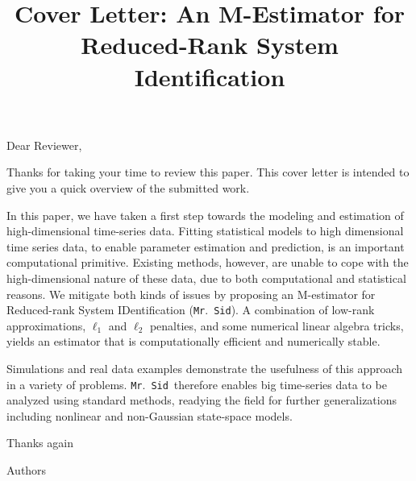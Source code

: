 \documentclass[fleqn,12pt]{article}
\newcommand{\mrsid}{{\sc \texttt{Mr}.~\texttt{Sid}}}
\begin{document}
\title{Cover Letter: An M-Estimator for Reduced-Rank System Identification
}
\date{}
\maketitle

\noindent Dear Reviewer,
\newline

Thanks for taking your time to review this paper. This cover letter is intended to give you a quick overview of the submitted work.

In this paper, we have taken a first step towards the modeling and estimation of high-dimensional time-series data. Fitting statistical models to high dimensional time series data, to enable parameter estimation and prediction, is an important computational primitive. Existing methods, however, are unable to cope with the high-dimensional nature of these data, due to both computational and statistical reasons.  We mitigate both kinds of issues by proposing an M-estimator for Reduced-rank System IDentification (\mrsid). A combination of low-rank approximations, $\ell_1$ and $\ell_2$ penalties, and some numerical linear algebra tricks, yields an estimator that is computationally efficient and numerically stable.  

Simulations and real data examples demonstrate the usefulness of this approach in a variety of problems. \mrsid~therefore enables big time-series data to be analyzed using standard methods, readying the field for further generalizations including nonlinear and non-Gaussian state-space models.
\newline

\noindent Thanks again

\noindent Authors
\end{document}
